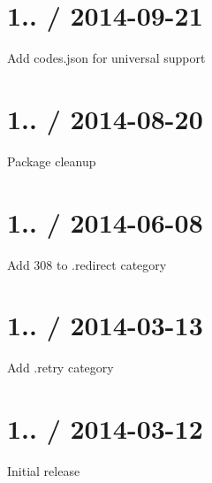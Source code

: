 \section*{1.. / 2014-\/09-\/21 }


\begin{DoxyItemize}
\item Add {\ttfamily codes.\+json} for universal support
\end{DoxyItemize}

\section*{1.. / 2014-\/08-\/20 }


\begin{DoxyItemize}
\item Package cleanup
\end{DoxyItemize}

\section*{1.. / 2014-\/06-\/08 }


\begin{DoxyItemize}
\item Add 308 to {\ttfamily .redirect} category
\end{DoxyItemize}

\section*{1.. / 2014-\/03-\/13 }


\begin{DoxyItemize}
\item Add {\ttfamily .retry} category
\end{DoxyItemize}

\section*{1.. / 2014-\/03-\/12 }


\begin{DoxyItemize}
\item Initial release 
\end{DoxyItemize}
